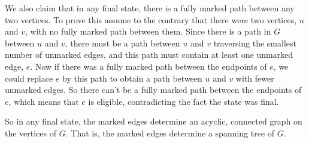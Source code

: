\begin{problem}
\begin{solution}
We also claim that in any final state, there is a fully marked path
between any two vertices.  To prove this assume to the contrary that there
were two vertices, $u$ and $v$, with no fully marked path between them.
Since there is a path in $G$ between $u$ and $v$, there must be a path
between $u$ and $v$ traversing the smallest number of unmarked edges, and
this path must contain at least one unmarked edge, $e$.  Now if there was
a fully marked path between the endpoints of $e$, we could replace $e$ by
this path to obtain a path between $u$ and $v$ with fewer unmarked edges.
So there can't be a fully marked path between the endpoints of $e$, which
means that $e$ is eligible, contradicting the fact the state was final.

So in any final state, the marked edges determine an acyclic, connected
graph on the vertices of $G$.  That is, the marked edges determine a
spanning tree of $G$.
\end{solution}

\end{problem}

